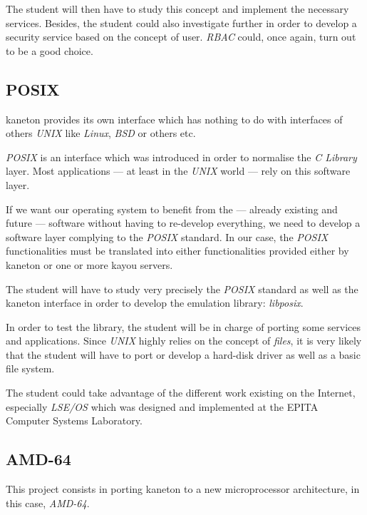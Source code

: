 \begin{multicols}{2}
The student will then have to study this concept and implement the necessary
services. Besides, the student could also investigate further in order
to develop a security service based on the concept of user. \textit{RBAC}
could, once again, turn out to be a good choice.

%
%

\subsection{POSIX}

kaneton provides its own interface which has nothing to do with interfaces
of others \textit{UNIX} like \textit{Linux}, \textit{BSD} or others etc.

\textit{POSIX} is an interface which was introduced in order to normalise the
\textit{C Library} layer. Most applications --- at least in the \textit{UNIX}
world --- rely on this software layer.

If we want our operating system to benefit from the --- already existing and
future --- software without having to re-develop everything, we need to
develop a software layer complying to the \textit{POSIX} standard. In our case,
the \textit{POSIX} functionalities must be translated into either
functionalities provided either by kaneton or one or more kayou servers.

The student will have to study very precisely the \textit{POSIX} standard
as well as the kaneton interface in order to develop the emulation library:
\textit{libposix}.

In order to test the library, the student will be in charge of porting some
services and applications. Since \textit{UNIX} highly relies on the concept
of \textit{files}, it is very likely that the student will have to port
or develop a hard-disk driver as well as a basic file system.

The student could take advantage of the different work existing on the
Internet, especially \textit{LSE/OS} which was designed and implemented
at the EPITA Computer Systems Laboratory.

%
%

\subsection{AMD-64}

This project consists in porting kaneton to a new microprocessor architecture,
in this case, \textit{AMD-64}.


\end{multicols}
